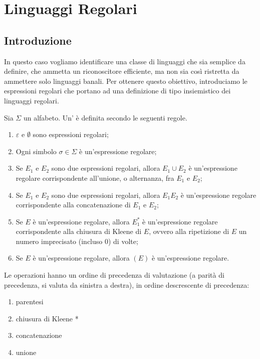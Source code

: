 \chapter{Linguaggi Regolari}\label{cha:Linguaggi-regolari}




\section{Introduzione}\label{sec:regolari-introduzione}

In questo caso vogliamo identificare una classe di linguaggi che sia semplice da definire, che ammetta un riconoscitore
efficiente, ma non sia così ristretta da ammettere solo linguaggi banali.
Per ottenere questo obiettivo, introduciamo le espressioni regolari che portano ad una definizione di tipo
insiemistico dei linguaggi regolari.

\begin{definition}\label{def:regex}
Sia $\Sigma$ un alfabeto. Un' è definita secondo le seguenti regole.
\begin{enumerate}
\item $\varepsilon$ e $\emptyset$ sono espressioni regolari;
\item Ogni simbolo $\sigma\in\Sigma$ è un'espressione regolare;
\item Se $E_1$ e $E_2$ sono due espressioni regolari, allora $E_1 \cup E_2$ è un'espressione regolare corrispondente
	  all'unione, o alternanza, fra $E_1$ e $E_2$;
\item Se $E_1$ e $E_2$ sono due espressioni regolari, allora $E_1 E_2$ è un'espressione regolare corrispondente
	  alla concatenazione di $E_1$ e $E_2$;
\item Se $E$ è un'espressione regolare, allora $E_1^{*}$ è un'espressione regolare corrispondente
	  alla chiusura di Kleene di $E$, ovvero alla ripetizione di $E$ un numero imprecisato (incluso $0$) di volte;
\item Se $E$ è un'espressione regolare, allora $(E)$ è un'espressione regolare.
\end{enumerate}
\end{definition}

Le operazioni hanno un ordine di precedenza di valutazione (a parità di precedenza, si valuta da sinistra a destra), in
ordine descrescente di precedenza:
\begin{enumerate}
	\item parentesi
	\item chiusura di Kleene *
	\item concatenazione
	\item unione
\end{enumerate}


